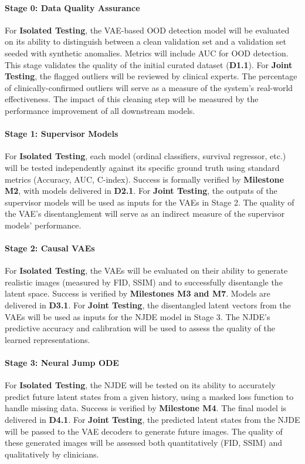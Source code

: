 \documentclass[11pt, a4paper]{article}
\begin{document}
\paragraph{Stage 0: Data Quality Assurance}
For \textbf{Isolated Testing}, the VAE-based OOD detection model will be evaluated on its ability to distinguish between a clean validation set and a validation set seeded with synthetic anomalies. Metrics will include AUC for OOD detection. This stage validates the quality of the initial curated dataset (\textbf{D1.1}). For \textbf{Joint Testing}, the flagged outliers will be reviewed by clinical experts. The percentage of clinically-confirmed outliers will serve as a measure of the system's real-world effectiveness. The impact of this cleaning step will be measured by the performance improvement of all downstream models.

\paragraph{Stage 1: Supervisor Models}
For \textbf{Isolated Testing}, each model (ordinal classifiers, survival regressor, etc.) will be tested independently against its specific ground truth using standard metrics (Accuracy, AUC, C-index). Success is formally verified by \textbf{Milestone M2}, with models delivered in \textbf{D2.1}. For \textbf{Joint Testing}, the outputs of the supervisor models will be used as inputs for the VAEs in Stage 2. The quality of the VAE's disentanglement will serve as an indirect measure of the supervisor models' performance.

\paragraph{Stage 2: Causal VAEs}
For \textbf{Isolated Testing}, the VAEs will be evaluated on their ability to generate realistic images (measured by FID, SSIM) and to successfully disentangle the latent space. Success is verified by \textbf{Milestones M3 and M7}. Models are delivered in \textbf{D3.1}. For \textbf{Joint Testing}, the disentangled latent vectors from the VAEs will be used as inputs for the NJDE model in Stage 3. The NJDE's predictive accuracy and calibration will be used to assess the quality of the learned representations.

\paragraph{Stage 3: Neural Jump ODE}
For \textbf{Isolated Testing}, the NJDE will be tested on its ability to accurately predict future latent states from a given history, using a masked loss function to handle missing data. Success is verified by \textbf{Milestone M4}. The final model is delivered in \textbf{D4.1}. For \textbf{Joint Testing}, the predicted latent states from the NJDE will be passed to the VAE decoders to generate future images. The quality of these generated images will be assessed both quantitatively (FID, SSIM) and qualitatively by clinicians.
\end{document}
